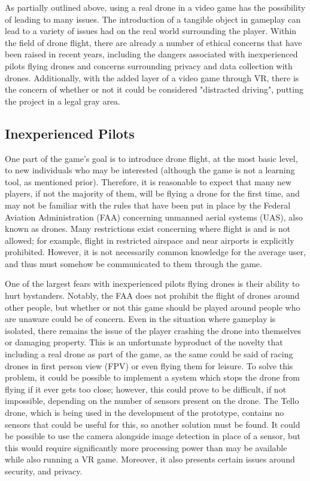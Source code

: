 \documentclass[10pt,twocolumn]{article}
\begin{document}
As partially outlined above, using a real drone in a video game has the possibility of leading to many issues. The introduction of a tangible object in gameplay can lead to a variety of issues had on the real world surrounding the player. Within the field of drone flight, there are already a number of ethical concerns that have been raised in recent years, including the dangers associated with inexperienced pilots flying drones and concerns surrounding privacy and data collection with drones. Additionally, with the added layer of a video game through VR, there is the concern of whether or not it could be considered "distracted driving", putting the project in a legal gray area.

\subsection{Inexperienced Pilots}
One part of the game's goal is to introduce drone flight, at the most basic level, to new individuals who may be interested (although the game is not a learning tool, as mentioned prior). Therefore, it is reasonable to expect that many new players, if not the majority of them, will be flying a drone for the first time, and may not be familiar with the rules that have been put in place by the Federal Aviation Administration (FAA) concerning unmanned aerial systems (UAS), also known as drones. Many restrictions exist concerning where flight is and is not allowed; for example, flight in restricted airspace and near airports is explicitly prohibited\cite{DronesFAA}. However, it is not necessarily common knowledge for the average user, and thus must somehow be communicated to them through the game.

One of the largest fears with inexperienced pilots flying drones is their ability to hurt bystanders. Notably, the FAA does not prohibit the flight of drones around other people, but whether or not this game should be played around people who are unaware could be of concern. Even in the situation where gameplay is isolated, there remains the issue of the player crashing the drone into themselves or damaging property. This is an unfortunate byproduct of the novelty that including a real drone as part of the game, as the same could be said of racing drones in first person view (FPV) or even flying them for leisure. To solve this problem, it could be possible to implement a system which stops the drone from flying if it ever gets too close; however, this could prove to be difficult, if not impossible, depending on the number of sensors present on the drone. The Tello drone, which is being used in the development of the prototype, contains no sensors that could be useful for this, so another solution must be found. It could be possible to use the camera alongside image detection in place of a sensor, but this would require significantly more processing power than may be available while also running a VR game. Moreover, it also presents certain issues around security, and privacy.
\end{document}
